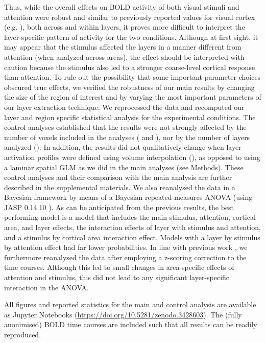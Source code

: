 \documentclass[9pt,lineno]{aperture}
\begin{document}
Thus, while the overall effects on BOLD activity of both visual stimuli and attention were robust and similar to previously reported values for visual cortex (e.g. \citep{Kastner1999,Jehee2011, Koopmans2010}), both across and within layers, it proves more difficult to interpret the layer-specific pattern of activity for the two conditions. Although at first sight, it may appear that the stimulus affected the layers in a manner different from attention (when analyzed across areas), the effect should be interpreted with caution because the stimulus also led to a stronger coarse-level cortical response than attention. 
To rule out the possibility that some important parameter choices obscured true effects, we verified the robustness of our main results by changing the size of the region of interest and by varying the most important parameters of our layer extraction technique. We reprocessed the data and recomputed our layer and region specific statistical analysis for the experimental conditions. The control analyses established that the results were not strongly affected by the number of voxels included in the analyses ( and ), nor by the number of layers analyzed (). In addition, the results did not qualitatively change when layer activation profiles were defined using volume interpolation (), as opposed to using a laminar spatial GLM as we did in the main analyses (see Methods). These control analyses and their comparison with the main analysis are further described in the supplemental materials. 
We also reanalysed the data in a Bayesian framework by means of a Bayesian repeated measures ANOVA (using JASP 0.14.10 \citep{Marsman2017}). As can be anticipated from the previous results, the best performing model is a model that includes the main stimulus, attention, cortical area, and layer effects, the interaction effects of layer with stimulus and attention, and a stimulus by cortical area interaction effect. Models with a layer by stimulus by attention effect had far lower probabilities. 
In line with previous work \citep{Lawrence2018}, we furthermore reanalysed the data after employing a z-scoring correction to the time courses. Although this led to small changes in area-specific effects of attention and stimulus, this did not lead to any significant layer-specific interaction in the ANOVA.

All figures and reported statistics for the main and control analysis are available as Jupyter Notebooks (\url{https://doi.org/10.5281/zenodo.3428603}). The (fully anonimised) BOLD time courses are included such that all results can be readily reproduced. 
\end{document}
